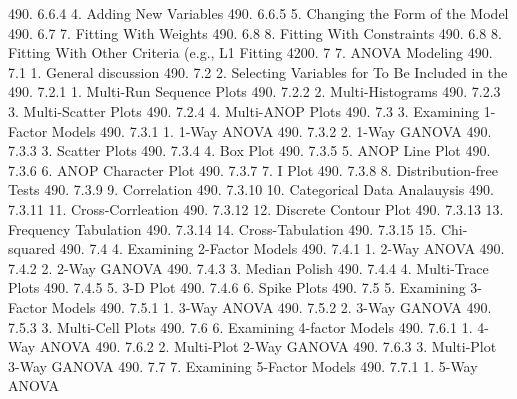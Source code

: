490.      6.6.4                       4. Adding New Variables
490.      6.6.5                       5. Changing the Form of the Model
490.      6.7                   7. Fitting With Weights
490.      6.8                   8. Fitting With Constraints
490.      6.8                   8. Fitting With Other Criteria (e.g., L1 Fitting
4200.     7               7. ANOVA Modeling
490.      7.1                   1. General discussion
490.      7.2                   2. Selecting Variables for To Be Included in the
490.      7.2.1                       1. Multi-Run Sequence Plots
490.      7.2.2                       2. Multi-Histograms
490.      7.2.3                       3. Multi-Scatter Plots
490.      7.2.4                       4. Multi-ANOP Plots
490.      7.3                   3. Examining 1-Factor Models
490.      7.3.1                       1. 1-Way ANOVA
490.      7.3.2                       2. 1-Way GANOVA
490.      7.3.3                       3. Scatter Plots
490.      7.3.4                       4. Box Plot
490.      7.3.5                       5. ANOP Line Plot
490.      7.3.6                       6. ANOP Character Plot
490.      7.3.7                       7. I Plot
490.      7.3.8                       8. Distribution-free Tests
490.      7.3.9                       9. Correlation
490.      7.3.10                     10. Categorical Data Analauysis
490.      7.3.11                     11. Cross-Corrleation
490.      7.3.12                     12. Discrete Contour Plot
490.      7.3.13                     13. Frequency Tabulation
490.      7.3.14                     14. Cross-Tabulation
490.      7.3.15                     15. Chi-squared
490.      7.4                   4. Examining 2-Factor Models
490.      7.4.1                       1. 2-Way ANOVA
490.      7.4.2                       2. 2-Way GANOVA
490.      7.4.3                       3. Median Polish
490.      7.4.4                       4. Multi-Trace Plots
490.      7.4.5                       5. 3-D Plot
490.      7.4.6                       6. Spike Plots
490.      7.5                   5. Examining 3-Factor Models
490.      7.5.1                       1. 3-Way ANOVA
490.      7.5.2                       2. 3-Way GANOVA
490.      7.5.3                       3. Multi-Cell Plots
490.      7.6                   6. Examining 4-factor Models
490.      7.6.1                       1. 4-Way ANOVA
490.      7.6.2                       2. Multi-Plot 2-Way GANOVA
490.      7.6.3                       3. Multi-Plot 3-Way GANOVA
490.      7.7                   7. Examining 5-Factor Models
490.      7.7.1                       1. 5-Way ANOVA
